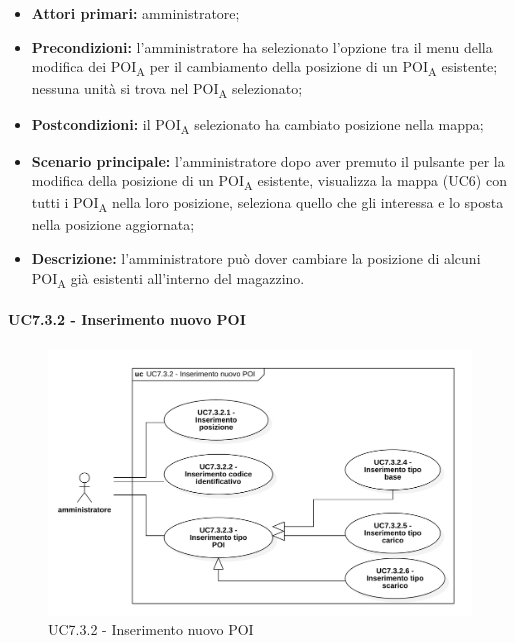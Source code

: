 \begin{itemize}

\item   \textbf{Attori primari:} amministratore;

\item   \textbf{Precondizioni:} l'amministratore ha selezionato l'opzione tra il menu della modifica dei POI\textsubscript{A} per il cambiamento della posizione di un POI\textsubscript{A} esistente; nessuna unità si trova nel POI\textsubscript{A} selezionato;

 \item   \textbf{Postcondizioni:} il POI\textsubscript{A} selezionato ha cambiato posizione nella mappa; 

\item   \textbf{Scenario principale:} l'amministratore dopo aver premuto il pulsante per la modifica della posizione di un POI\textsubscript{A} esistente, visualizza la mappa (UC6) con tutti i POI\textsubscript{A} nella loro posizione, seleziona quello che gli interessa e lo sposta nella posizione aggiornata;
   \item   \textbf{Descrizione:} l'amministratore può dover cambiare la posizione di alcuni POI\textsubscript{A} già esistenti all'interno del magazzino.

\end{itemize}



\paragraph{UC7.3.2 - Inserimento nuovo POI}

\begin{figure}[H]

  \centering

   \includegraphics[scale=0.52]{res/images/uc7-3-2.png}

  \caption{UC7.3.2 - Inserimento nuovo POI}

\end{figure}



